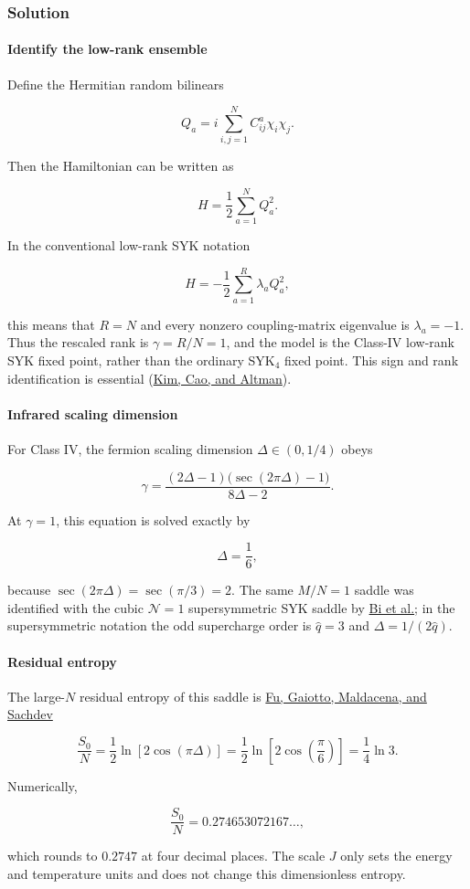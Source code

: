 \subsubsection*{Solution}
\paragraph*{Identify the low-rank ensemble}

Define the Hermitian random bilinears

\[
Q_a=i\sum_{i,j=1}^{N}C_{ij}^{a}\chi_i\chi_j.
\]

Then the Hamiltonian can be written as

\[
H=\frac12\sum_{a=1}^{N}Q_a^2.
\]

In the conventional low-rank SYK notation

\[
H=-\frac12\sum_{a=1}^{R}\lambda_a Q_a^2,
\]

this means that $R=N$ and every nonzero coupling-matrix eigenvalue is
$\lambda_a=-1$. Thus the rescaled rank is $\gamma=R/N=1$, and the model is
the Class-IV low-rank SYK fixed point, rather than the ordinary SYK$_4$
fixed point. This sign and rank identification is essential
(\href{https://arxiv.org/abs/1910.10173}{Kim, Cao, and Altman}).

\paragraph*{Infrared scaling dimension}

For Class IV, the fermion scaling dimension $\Delta\in(0,1/4)$ obeys

\[
\gamma=
\frac{(2\Delta-1)\bigl(\sec(2\pi\Delta)-1\bigr)}{8\Delta-2}.
\]

At $\gamma=1$, this equation is solved exactly by

\[
\Delta=\frac16,
\]

because $\sec(2\pi\Delta)=\sec(\pi/3)=2$. The same $M/N=1$ saddle was
identified with the cubic $\mathcal N=1$ supersymmetric SYK saddle by
\href{https://arxiv.org/abs/1701.07081}{Bi et al.}; in the supersymmetric
notation the odd supercharge order is $\widehat q=3$ and
$\Delta=1/(2\widehat q)$.

\paragraph*{Residual entropy}

The large-$N$ residual entropy of this saddle is
\href{https://arxiv.org/abs/1610.08917}{Fu, Gaiotto, Maldacena, and Sachdev}

\[
\frac{S_0}{N}
=\frac12\ln\!\left[2\cos(\pi\Delta)\right]
=\frac12\ln\!\left[2\cos\!\left(\frac{\pi}{6}\right)\right]
=\frac14\ln 3.
\]

Numerically,

\[
\frac{S_0}{N}=0.274653072167\ldots,
\]

which rounds to $0.2747$ at four decimal places. The scale $J$ only sets the
energy and temperature units and does not change this dimensionless entropy.
